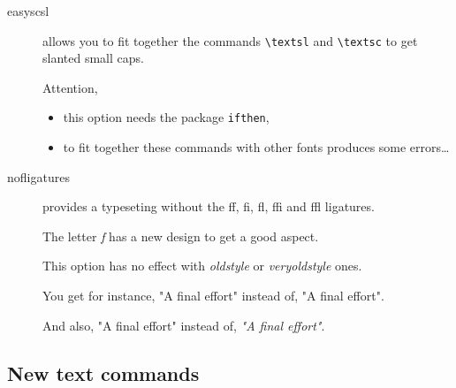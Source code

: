 \documentclass[a4paper,11pt]{christophe}
\begin{document}
\begin{description}
	
	\item[easyscsl] allows you to fit together the commands \verb=\textsl= and \verb=\textsc= to get slanted small caps.
	
				Attention,
				\begin{itemize}
					\item this option needs the package \texttt{ifthen},
					\item to fit together these commands with other fonts produces some errors\dots
				\end{itemize}
	\item[nofligatures] provides a typeseting without the ff, fi, fl, ffi and ffl ligatures.
	      
	      The letter \textit{f} has a new design to get a good aspect. 
	      
	      This option has no effect with \textit{oldstyle}
	      or \textit{veryoldstyle} ones.
	      
	      You get for instance, {\selectfont "A final effort"}
	      instead of, "A final effort".
	      
	      And also, {\selectfont "A final effort"}
	      instead of, \textit{"A final effort"}.
\end{description}

\subsection{New text commands}
\end{document}
